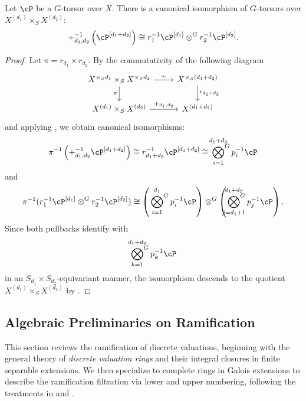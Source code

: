 \begin{prop}\label{prop:symmetric_powers_on_curves}
    Let $\cP$ be a $G$-torsor over $X$. There is a canonical isomorphism of $G$-torsors over $X^{(d_1)} \times_S X^{(d_2)}$:
    \[
    +_{d_1, d_2}^{-1} \left( \cP^{[d_1+d_2]} \right) \cong r_1^{-1} \cP^{[d_1]} \otimes^G r_2^{-1} \cP^{[d_2]}.
    \]
\end{prop}
\begin{proof}
Let $\pi = r_{d_1} \times r_{d_2}$. By the commutativity of the following diagram
\[
\begin{tikzcd}
X^{\times_S d_1} \times_S X^{\times_S d_2} \arrow[r, "\sim"] \arrow[d, "\pi"'] & X^{\times_S (d_1+d_2)} \arrow[d, "r_{d_1+d_2}"] \\
X^{(d_1)} \times_S X^{(d_2)} \arrow[r, "+_{d_1, d_2}"] & X^{(d_1+d_2)}
\end{tikzcd}
\]
and applying , we obtain canonical isomorphisms:
\[
\pi^{-1} \left( +_{d_1, d_2}^{-1} \cP^{[d_1+d_2]} \right) \cong r_{d_1+d_2}^{-1} \cP^{[d_1+d_2]} \cong \sideset{}{^G}\bigotimes_{i=1}^{d_1+d_2} p_i^{-1} \cP
\]
and
\[
\pi^{-1} (r_1^{-1} \cP^{[d_1]} \otimes^G r_2^{-1} \cP^{[d_2]}) \cong \left( \sideset{}{^G}\bigotimes_{i=1}^{d_1} p_i^{-1} \cP \right) \otimes^G \left( \sideset{}{^G}\bigotimes_{j=d_1+1}^{d_1+d_2} p_j^{-1} \cP \right).
\]
Since both pullbacks identify with
\[
\sideset{}{^G}\bigotimes_{k=1}^{d_1+d_2} p_k^{-1} \cP
\]
in an $S_{d_1} \times S_{d_2}$-equivariant manner, the isomorphism descends to the quotient $X^{(d_1)} \times_S X^{(d_2)}$ by .
\end{proof}

\subsection{Algebraic Preliminaries on Ramification}
This section reviews the ramification of discrete valuations, beginning with the general theory of \textit{discrete valuation rings} and their 
integral closures in finite separable extensions. 
We then specialize to complete rings in Galois extensions to describe the ramification filtration via lower and upper numbering, 
following the treatments in  and \cite{serreLF}.

